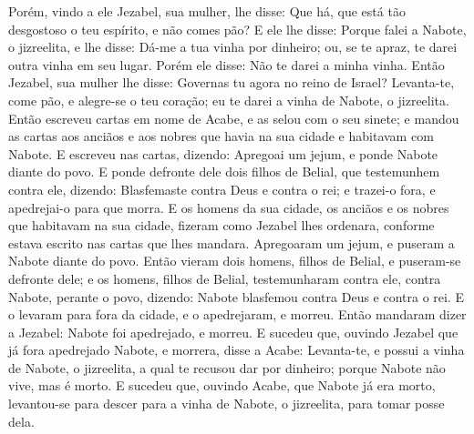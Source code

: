 Porém, vindo a ele Jezabel, sua mulher, lhe disse: Que há, que
está tão desgostoso o teu espírito, e não comes pão? E ele lhe
disse: Porque falei a Nabote, o jizreelita, e lhe disse: Dá-me a tua
vinha por dinheiro; ou, se te apraz, te darei outra vinha em seu
lugar. Porém ele disse: Não te darei a minha vinha. Então
Jezabel, sua mulher lhe disse: Governas tu agora no reino de Israel?
Levanta-te, come pão, e alegre-se o teu coração; eu te darei a vinha
de Nabote, o jizreelita. Então escreveu cartas em nome de Acabe,
e as selou com o seu sinete; e mandou as cartas aos anciãos e aos
nobres que havia na sua cidade e habitavam com Nabote. E
escreveu nas cartas, dizendo: Apregoai um jejum, e ponde Nabote
diante do povo. E ponde defronte dele dois filhos de Belial,
que testemunhem contra ele, dizendo: Blasfemaste contra Deus e
contra o rei; e trazei-o fora, e apedrejai-o para que morra.
E os homens da sua cidade, os anciãos e os nobres que
habitavam na sua cidade, fizeram como Jezabel lhes ordenara,
conforme estava escrito nas cartas que lhes mandara.
Apregoaram um jejum, e puseram a Nabote diante do povo.
Então vieram dois homens, filhos de Belial, e puseram-se
defronte dele; e os homens, filhos de Belial, testemunharam contra
ele, contra Nabote, perante o povo, dizendo: Nabote blasfemou contra
Deus e contra o rei. E o levaram para fora da cidade, e o
apedrejaram, e morreu. Então mandaram dizer a Jezabel: Nabote
foi apedrejado, e morreu. E sucedeu que, ouvindo Jezabel que
já fora apedrejado Nabote, e morrera, disse a Acabe: Levanta-te, e
possui a vinha de Nabote, o jizreelita, a qual te recusou dar por
dinheiro; porque Nabote não vive, mas é morto. E sucedeu que,
ouvindo Acabe, que Nabote já era morto, levantou-se para descer para
a vinha de Nabote, o jizreelita, para tomar posse dela.

